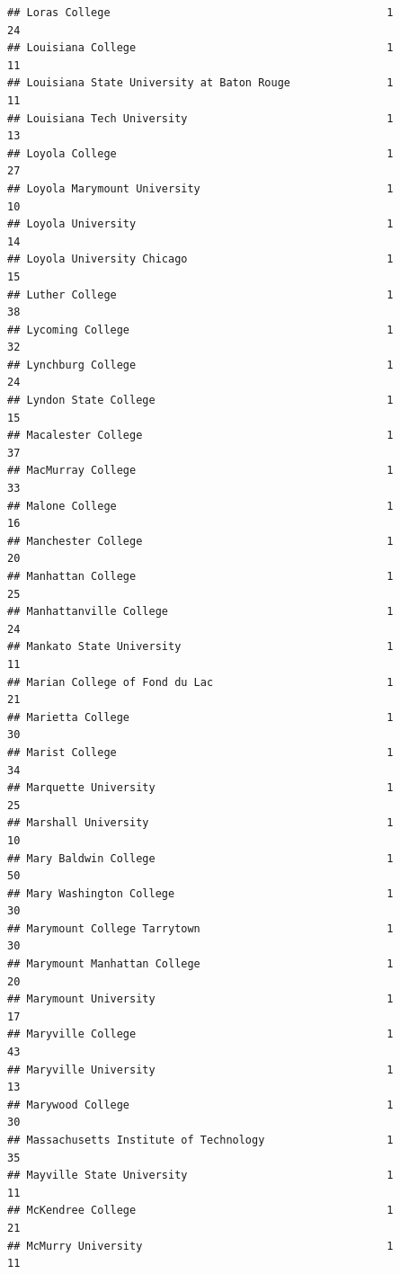 \documentclass[
]{article}
\begin{document}
\begin{verbatim}
## Loras College                                           1          24
## Louisiana College                                       1          11
## Louisiana State University at Baton Rouge               1          11
## Louisiana Tech University                               1          13
## Loyola College                                          1          27
## Loyola Marymount University                             1          10
## Loyola University                                       1          14
## Loyola University Chicago                               1          15
## Luther College                                          1          38
## Lycoming College                                        1          32
## Lynchburg College                                       1          24
## Lyndon State College                                    1          15
## Macalester College                                      1          37
## MacMurray College                                       1          33
## Malone College                                          1          16
## Manchester College                                      1          20
## Manhattan College                                       1          25
## Manhattanville College                                  1          24
## Mankato State University                                1          11
## Marian College of Fond du Lac                           1          21
## Marietta College                                        1          30
## Marist College                                          1          34
## Marquette University                                    1          25
## Marshall University                                     1          10
## Mary Baldwin College                                    1          50
## Mary Washington College                                 1          30
## Marymount College Tarrytown                             1          30
## Marymount Manhattan College                             1          20
## Marymount University                                    1          17
## Maryville College                                       1          43
## Maryville University                                    1          13
## Marywood College                                        1          30
## Massachusetts Institute of Technology                   1          35
## Mayville State University                               1          11
## McKendree College                                       1          21
## McMurry University                                      1          11

\end{verbatim}
\end{document}
